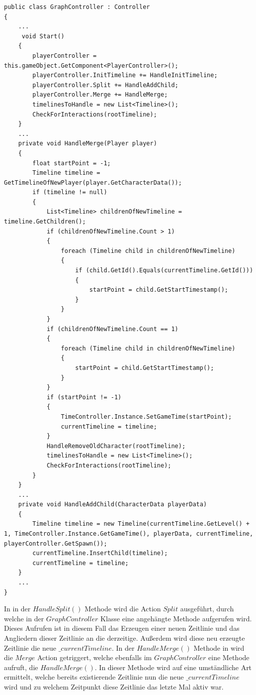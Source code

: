 \begin{lstlisting}[caption={HandleSplit und HandleMerge Methode aus GraphController.cs}, label={sec:split_merge_old_graph}]
public class GraphController : Controller
{
    ...
     void Start()
    {
        playerController = this.gameObject.GetComponent<PlayerController>();
        playerController.InitTimeline += HandleInitTimeline;
        playerController.Split += HandleAddChild;
        playerController.Merge += HandleMerge;
        timelinesToHandle = new List<Timeline>();
        CheckForInteractions(rootTimeline);
    }
    ...
    private void HandleMerge(Player player)
    {
        float startPoint = -1;
        Timeline timeline = GetTimelineOfNewPlayer(player.GetCharacterData());
        if (timeline != null)
        {
            List<Timeline> childrenOfNewTimeline = timeline.GetChildren();
            if (childrenOfNewTimeline.Count > 1)
            {
                foreach (Timeline child in childrenOfNewTimeline)
                {
                    if (child.GetId().Equals(currentTimeline.GetId()))
                    {
                        startPoint = child.GetStartTimestamp();
                    }
                }
            }
            if (childrenOfNewTimeline.Count == 1)
            {
                foreach (Timeline child in childrenOfNewTimeline)
                {
                    startPoint = child.GetStartTimestamp();
                }
            }
            if (startPoint != -1)
            {
                TimeController.Instance.SetGameTime(startPoint);
                currentTimeline = timeline;
            }
            HandleRemoveOldCharacter(rootTimeline);
            timelinesToHandle = new List<Timeline>();
            CheckForInteractions(rootTimeline);
        }
    }
    ...
    private void HandleAddChild(CharacterData playerData)
    {
        Timeline timeline = new Timeline(currentTimeline.GetLevel() + 1, TimeController.Instance.GetGameTime(), playerData, currentTimeline, playerController.GetSpawn());
        currentTimeline.InsertChild(timeline);
        currentTimeline = timeline;
    }
    ...
}
\end{lstlisting}

In  in der $HandleSplit()$ Methode wird die Action $Split$ ausgeführt, durch welche in der $GraphController$ Klasse eine angehängte Methode aufgerufen wird. Dieses Aufrufen ist in diesem Fall das Erzeugen einer neuen Zeitlinie und das Angliedern dieser Zeitlinie an die derzeitige. Außerdem wird diese neu erzeugte Zeitlinie die neue $\_currentTimeline$.
In der $HandleMerge()$ Methode in  wird die $Merge$ Action getriggert, welche ebenfalls im $GraphController$ eine Methode aufruft, die $HandleMerge()$. In dieser Methode wird auf eine umständliche Art ermittelt, welche bereits existierende Zeitlinie nun die neue $\_currentTimeline$ wird und zu welchem Zeitpunkt diese Zeitlinie das letzte Mal aktiv war. 


